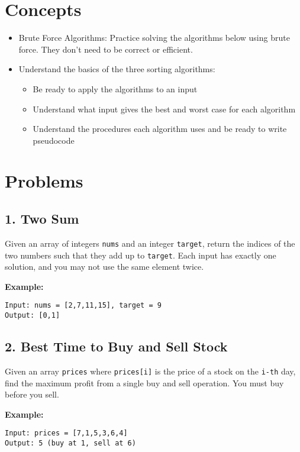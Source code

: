 \documentclass[12pt]{article}
\begin{document}
\section*{Concepts}
\begin{itemize}[leftmargin=1.5em]
  \item Brute Force Algorithms: Practice solving the algorithms below using brute force. They don't need to be correct or efficient.
  \item Understand the basics of the three sorting algorithms:
  \begin{itemize}
    \item Be ready to apply the algorithms to an input
    \item Understand what input gives the best and worst case for each algorithm
    \item Understand the procedures each algorithm uses and be ready to write pseudocode
  \end{itemize}
\end{itemize}

\section*{Problems}

\subsection*{1. Two Sum}
Given an array of integers \texttt{nums} and an integer \texttt{target}, return the indices of the two numbers such that they add up to \texttt{target}. Each input has exactly one solution, and you may not use the same element twice.

\textbf{Example:}
\begin{verbatim}
Input: nums = [2,7,11,15], target = 9
Output: [0,1]
\end{verbatim}

\subsection*{2. Best Time to Buy and Sell Stock}
Given an array \texttt{prices} where \texttt{prices[i]} is the price of a stock on the \texttt{i-th} day, find the maximum profit from a single buy and sell operation. You must buy before you sell.

\textbf{Example:}
\begin{verbatim}
Input: prices = [7,1,5,3,6,4]
Output: 5 (buy at 1, sell at 6)
\end{verbatim}
\end{document}
